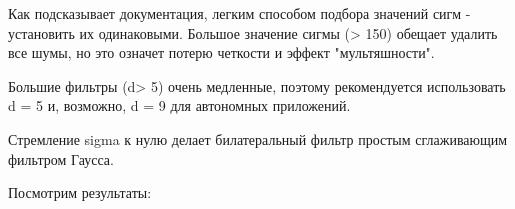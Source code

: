 \documentclass[14pt,a4paper,report]{report}
\begin{document}
Как подсказывает документация, легким способом подбора значений сигм - установить их одинаковыми. Большое значение сигмы (> 150) обещает удалить все шумы, но это означет потерю четкости и эффект "мультяшности".

Большие фильтры (d> 5) очень медленные, поэтому рекомендуется использовать d = 5 и, возможно, d = 9 для автономных приложений.

Стремление sigma к нулю делает билатеральный фильтр простым сглаживающим фильтром Гаусса.


Посмотрим результаты:


\begin{figure}[h]
\begin{minipage}[h]{0.47\linewidth}
\end{minipage}
\hfill
\begin{minipage}[h]{0.47\linewidth}

\end{minipage}
\end{figure}
\end{document}

